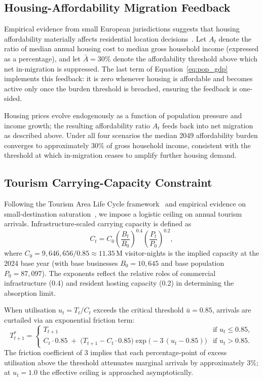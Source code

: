 \documentclass{article}
\begin{document}
\subsection{Housing-Affordability Migration Feedback}
\label{sec:housing_feedback}

Empirical evidence from small European jurisdictions suggests that housing
affordability materially affects residential location
decisions~\cite{Sa2015,Diamond2016}. Let $A_t$ denote the ratio of median
annual housing cost to median gross household income (expressed as a
percentage), and let $\bar{A}=30\%$ denote the affordability threshold above
which net in-migration is suppressed. The last term of
Equation~\eqref{eq:pop_gdp} implements this feedback: it is zero whenever
housing is affordable and becomes active only once the burden threshold is
breached, ensuring the feedback is one-sided.

Housing prices evolve endogenously as a function of population pressure and
income growth; the resulting affordability ratio $A_t$ feeds back into net
migration as described above. Under all four scenarios the median 2049
affordability burden converges to approximately 30\% of gross household income,
consistent with the threshold at which in-migration ceases to amplify further
housing demand.

\subsection{Tourism Carrying-Capacity Constraint}
\label{sec:tourism_cap}

Following the Tourism Area Life Cycle framework~\cite{Butler1980} and empirical
evidence on small-destination saturation~\cite{Peeters2019}, we impose a
logistic ceiling on annual tourism arrivals. Infrastructure-scaled carrying
capacity is defined as
\begin{equation}
  C_t = C_0 \left(\frac{B_t}{B_0}\right)^{0.4}
              \left(\frac{P_t}{P_0}\right)^{0.2},
  \label{eq:tour_cap}
\end{equation}
where $C_0 = 9{,}646{,}656 / 0.85 \approx 11.35\,\text{M}$ visitor-nights is
the implied capacity at the 2024 base year (with base businesses $B_0=10{,}645$
and base population $P_0=87{,}097$). The exponents reflect the relative roles of
commercial infrastructure (0.4) and resident hosting capacity (0.2) in
determining the absorption limit.

When utilisation $u_t = T_t / C_t$ exceeds the critical threshold
$\bar{u}=0.85$, arrivals are curtailed via an exponential friction term:
\begin{equation}
  T_{t+1}^* =
  \begin{cases}
    T_{t+1} & \text{if } u_t \leq 0.85,\\[4pt]
    C_t \cdot 0.85\;+\;\bigl(T_{t+1} - C_t \cdot 0.85\bigr)
        \exp\!\bigl(-3\,(u_t - 0.85)\bigr) & \text{if } u_t > 0.85.
  \end{cases}
  \label{eq:tour_friction}
\end{equation}
The friction coefficient of 3 implies that each percentage-point of excess
utilisation above the threshold attenuates marginal arrivals by approximately
$3\%$; at $u_t=1.0$ the effective ceiling is approached asymptotically.
\end{document}
